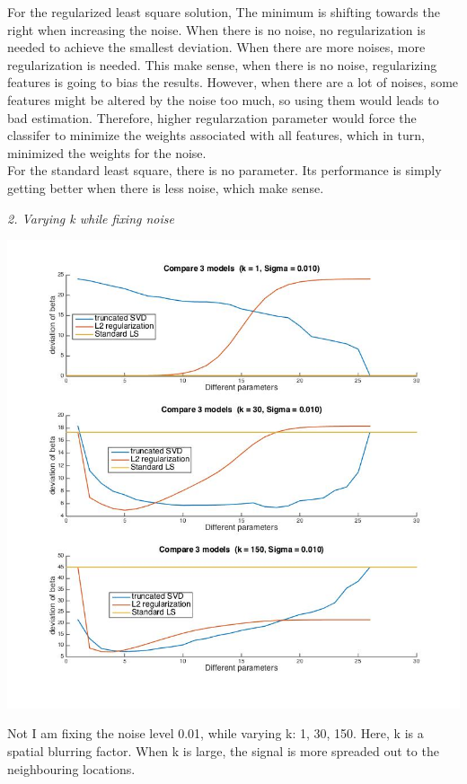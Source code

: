 \documentclass[paper=a4, fontsize=11pt]{scrartcl} %
\numberwithin{equation}{section} %
\numberwithin{figure}{section} %
\numberwithin{table}{section} %
\begin{document}
For the regularized least square solution, The minimum is shifting towards the right when increasing the noise. When there is no noise, no regularization is needed to achieve the smallest deviation. When there are more noises, more regularization is needed. This make sense, when there is no noise, regularizing features is going to bias the results. However, when there are a lot of noises, some features might be altered by the noise too much, so using them would leads to bad estimation. Therefore, higher regularzation parameter would force the classifer to minimize the weights associated with all features, which in turn, minimized the weights for the noise.  \\

For the standard least square, there is no parameter. Its performance is simply getting better when there is less noise, which make sense. 

\newpage
\textit{2. Varying k while fixing noise}
\begin{center}
\includegraphics[scale=.6]{2b_varyk.jpg}
\end{center}

Not I am fixing the noise level 0.01, while varying k: 1, 30, 150. Here, k is a spatial blurring factor. When k is large, the signal is more spreaded out to the neighbouring locations. \\
\end{document}

